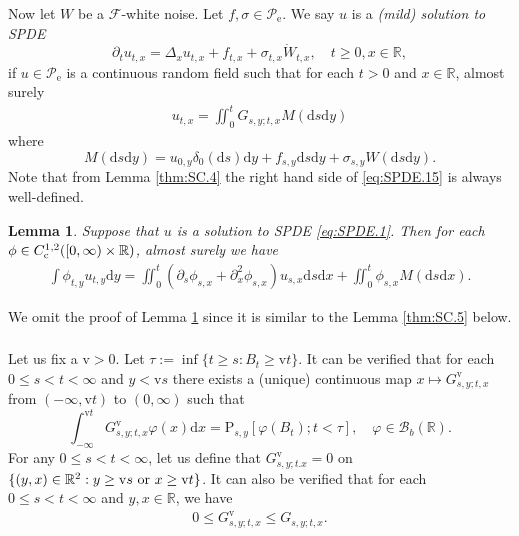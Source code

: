 \documentclass[12pt,a4paper]{amsart}
\numberwithin{equation}{section}
\theoremstyle{plain}
\newtheorem{lemma}[theorem]{Lemma}
\theoremstyle{remark}
\begin{document}
\subsubsection{} \label{sec:SPDE.1}
Now let $W$ be a $\mathcal F$-white noise. 
Let $f, \sigma\in \mathscr P_\mathrm e$. 
We say $u$ is a \emph{(mild) solution to SPDE}
\begin{equation} \label{eq:SPDE.1}
	\partial_t u_{t,x} = \Delta_x u_{t,x} + f_{t,x} + \sigma_{t,x} \dot W_{t,x}, \quad t\geq 0, x\in \mathbb R,
 \end{equation}
if $u \in \mathscr P_\mathrm e$ is a continuous random field such that for each $t> 0$ and $x\in \mathbb R$, almost surely
\begin{align} \label{eq:SPDE.15}
u_{t,x} 
= \iint_0^t G_{s,y;t,x} M(\mathrm ds\mathrm dy)
\end{align}
where
\[
M(\mathrm ds\mathrm dy) 
= u_{0,y} \delta_0(\mathrm ds) \mathrm dy + f_{s,y}\mathrm ds\mathrm dy + \sigma_{s,y}W(\mathrm ds\mathrm dy).
\]
Note that from Lemma \ref{thm:SC.4} the right hand side of \eqref{eq:SPDE.15} is always well-defined.

\begin{lemma} \label{thm:SC.45}
	Suppose that $u$ is a solution to SPDE \eqref{eq:SPDE.1}. 
	Then for each $\phi \in C_{\rm c}^{1,2}([0,\infty)\times \mathbb R)$, almost surely we have
\begin{align}
	\int \phi_{t,y} u_{t,y} \mathrm dy
	= \iint_0^t (\partial_s \phi_{s,x} +\partial_x^2 \phi_{s,x})u_{s,x}\mathrm ds\mathrm dx + \iint_0^t \phi_{s,x} M(\mathrm ds\mathrm dx).
\end{align}
\end{lemma}

We omit the proof of Lemma \ref{thm:SC.45} since it is similar to the Lemma \ref{thm:SC.5} below.

\subsubsection{}
Let us fix a $\mathrm v > 0$.
Let $\tau := \inf\{t \geq s : B_t \geq \mathrm vt \}$. 
It can be verified that for each $0\leq s< t< \infty$ and $y < \mathrm vs$ there exists a (unique) continuous map $x \mapsto G^\mathrm v_{s,y;t,x}$ from $(-\infty,\mathrm v t)$ to $(0,\infty)$ such that
\[
	\int_{-\infty}^{\mathrm vt} G^\mathrm v_{s,y;t,x} \varphi(x)\mathrm dx = \mathrm P_{s,y}[\varphi( B_t); t < \tau], \quad \varphi \in \mathcal B_b(\mathbb R).
\] 
For any $0\leq s< t< \infty$, let us define that $G^{\mathrm v}_{s,y;t.x} = 0$ on $\{(y,x)\in \mathbb R^2: y\geq \mathrm vs ~{\rm or}~x\geq \mathrm vt \}$.
It can also be verified that for each  $0\leq s< t< \infty$ and $y,x\in \mathbb R$, we have 
\begin{align} \label{eq:SPDE.16}
0\leq G^{\mathrm v}_{s,y;t,x} \leq G_{s,y;t,x}.
\end{align}
\end{document}
